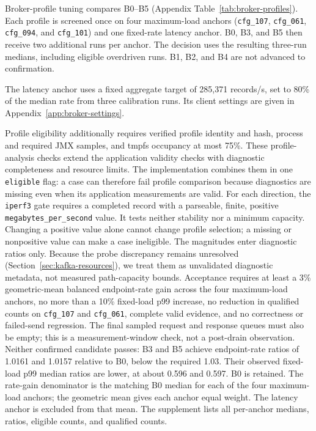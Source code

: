 \documentclass[10pt]{article}
\begin{document}
Broker-profile tuning compares B0--B5 (Appendix Table~\ref{tab:broker-profiles}).
Each profile is screened once on four maximum-load anchors
(\texttt{cfg\_107}, \texttt{cfg\_061}, \texttt{cfg\_094}, and \texttt{cfg\_101})
and one fixed-rate latency anchor.  B0, B3, and B5 then receive two additional
runs per anchor.  The decision uses the resulting three-run medians, including
eligible overdriven runs.  B1, B2, and B4 are not advanced to confirmation.


The latency anchor uses a fixed aggregate target of 285,371 records/s,
set to 80\% of the median rate from three calibration runs. Its client settings
are given in Appendix~\ref{app:broker-settings}.

Profile eligibility additionally requires verified profile identity and hash,
process and required JMX samples, and tmpfs occupancy at most 75\%.
These profile-analysis checks extend the application validity checks with
diagnostic completeness and resource limits. The implementation combines them
in one \texttt{eligible} flag: a case can therefore fail profile comparison
because diagnostics are missing even when its application measurements are valid.
For each direction, the \texttt{iperf3} gate requires a completed record with a
parseable, finite, positive \texttt{megabytes\_per\_second} value. It tests neither
stability nor a minimum capacity. Changing a positive value alone cannot change
profile selection; a missing or nonpositive value can make a case ineligible.
The magnitudes enter diagnostic ratios only. Because the probe discrepancy
remains unresolved (Section~\ref{sec:kafka-resources}), we treat them as
unvalidated diagnostic metadata, not measured path-capacity bounds.
Acceptance requires at least a 3\% geometric-mean balanced endpoint-rate gain across the
four maximum-load anchors, no more than a 10\% fixed-load p99 increase, no
reduction in qualified counts on \texttt{cfg\_107} and \texttt{cfg\_061},
complete valid evidence, and no correctness or failed-send regression.
The final sampled request and response queues must also be empty; this is a
measurement-window check, not a post-drain observation.
Neither confirmed candidate passes: B3 and B5 achieve endpoint-rate ratios of
1.0161 and 1.0157 relative to B0, below the required 1.03. Their observed
fixed-load p99 median ratios are lower, at about 0.596 and 0.597. B0 is retained.
The rate-gain denominator is the matching B0 median for each of the four
maximum-load anchors; the geometric mean gives each anchor equal weight.
The latency anchor is excluded from that mean. The supplement lists all
per-anchor medians, ratios, eligible counts, and qualified counts.
\end{document}
